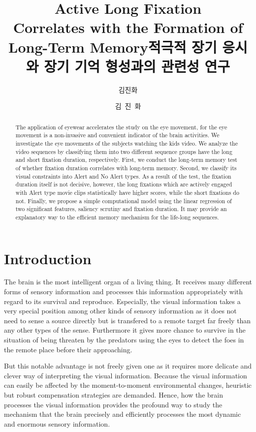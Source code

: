 \documentclass[oneside,master]{snueethesis}
\title{Active Long Fixation \\
Correlates with the Formation of \\
Long-Term Memory}
\title*{적극적 장기 응시와 장기 기억 형성과의 관련성 연구}
\author{김진화}
\author*{김~진~화} %
\begin{document}
\makefrontcover
\makefrontcover
\makeapproval

\cleardoublepage
{}

\begin{abstract}
The application of eyewear accelerates the study on the eye movement, for the eye movement is a non-invasive and convenient indicator of the brain activities. We investigate the eye movements of the subjects watching the kids video. We analyze the video sequences by classifying them into two different sequence groups have the long and short fixation duration, respectively. First, we conduct the long-term memory test of whether fixation duration correlates with long-term memory. Second, we classify its visual constraints into Alert and No Alert types. As a result of the test, the fixation duration itself is not decisive, however, the long fixations which are actively engaged with Alert type movie clips statistically have higher scores, while the short fixations do not. Finally, we propose a simple computational model using the linear regression of two significant features, saliency scrutiny and fixation duration. It may provide an explanatory way to the efficient memory mechanism for the life-long sequences.


\end{abstract}

\tableofcontents
\listoffigures
\listoftables

\cleardoublepage
{}

\chapter{Introduction}

The brain is the most intelligent organ of a living thing. It receives many different forms of sensory information and processes this information appropriately with regard to its survival and reproduce. Especially, the visual information takes a very special position among other kinds of sensory information as it does not need to sense a source directly but is transfered to a remote target far freely than any other types of the sense. Furthermore it gives more chance to survive in the situation of being threaten by the predators using the eyes to detect the foes in the remote place before their approaching. 

But this notable advantage is not freely given one as it requires more delicate and clever way of interpreting the visual information. Because the visual information can easily be affected by the moment-to-moment environmental changes, heuristic but robust compensation strategies are demanded. Hence, how the brain processes the visual information provides the profound way to study the mechanism that the brain precisely and efficiently processes the most dynamic and enormous sensory information.
\end{document}

